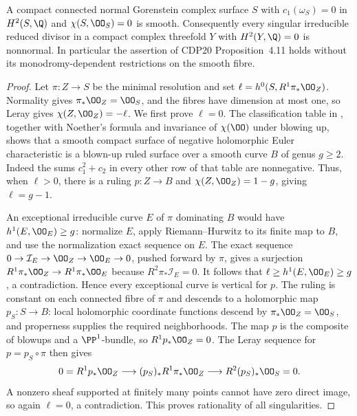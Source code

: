 
\begin{proposition}\label{cdp:st:A.5.2}
A compact connected normal Gorenstein complex surface $S$ with $c_1(\omega_S)=0$ in $H^2(S,\Q)$ and $\chi(S,\OO_S)=0$ is smooth. Consequently every singular irreducible reduced divisor in a compact complex threefold $Y$ with $H^2(Y,\Q)=0$ is nonnormal. In particular the assertion of CDP20 Proposition~4.11 holds without its monodromy-dependent restrictions on the smooth fibre.
\end{proposition}
\begin{proof}
Let $\pi:Z\to S$ be the minimal resolution and set $\ell=h^0(S,R^1\pi_*\OO_Z)$. Normality gives $\pi_*\OO_Z=\OO_S$, and the fibres have dimension at most one, so Leray gives $\chi(Z,\OO_Z)=-\ell$. We first prove $\ell=0$. The classification table in \cite[Theorem~2.2]{Peters2021}, together with Noether's formula and invariance of $\chi(\OO)$ under blowing up, shows that a smooth compact surface of negative holomorphic Euler characteristic is a blown-up ruled surface over a smooth curve $B$ of genus $g\ge2$. Indeed the sums $c_1^2+c_2$ in every other row of that table are nonnegative. Thus, when $\ell>0$, there is a ruling $p:Z\to B$ and $\chi(Z,\OO_Z)=1-g$, giving $\ell=g-1$.

An exceptional irreducible curve $E$ of $\pi$ dominating $B$ would have $h^1(E,\OO_E)\ge g$: normalize $E$, apply Riemann--Hurwitz to its finite map to $B$, and use the normalization exact sequence on $E$. The exact sequence $0\to\mathcal I_E\to\OO_Z\to\OO_E\to0$, pushed forward by $\pi$, gives a surjection $R^1\pi_*\OO_Z\to R^1\pi_*\OO_E$ because $R^2\pi_*\mathcal I_E=0$. It follows that $\ell\ge h^1(E,\OO_E)\ge g$, a contradiction. Hence every exceptional curve is vertical for $p$. The ruling is constant on each connected fibre of $\pi$ and descends to a holomorphic map $p_S:S\to B$: local holomorphic coordinate functions descend by $\pi_*\OO_Z=\OO_S$, and properness supplies the required neighborhoods. The map $p$ is the composite of blowups and a $\PP^1$-bundle, so $R^1p_*\OO_Z=0$. The Leray sequence for $p=p_S\circ\pi$ then gives
\[
0=R^1p_*\OO_Z\longrightarrow (p_S)_*R^1\pi_*\OO_Z
 \longrightarrow R^2(p_S)_*\OO_S=0.
\]
A nonzero sheaf supported at finitely many points cannot have zero direct image, so again $\ell=0$, a contradiction. This proves rationality of all singularities.


\end{proof}
